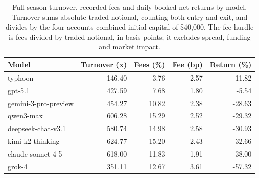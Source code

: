 \begin{table}[htbp]
\centering\small
\caption{Full-season turnover, recorded fees and daily-booked net returns by model. Turnover sums absolute traded notional, counting both entry and exit, and divides by the four accounts\textquotesingle{} combined initial capital of \$40,000. The fee hurdle is fees divided by traded notional, in basis points; it excludes spread, funding and market impact.}
\label{tab:feedbackcosts}
\begin{tabular}{lrrrr}
\toprule
Model & Turnover (x) & Fees (\%) & Fee (bp) & Return (\%) \\
\midrule
typhoon & 146.40 & 3.76 & 2.57 & 11.82 \\
gpt-5.1 & 427.59 & 7.68 & 1.80 & -5.54 \\
gemini-3-pro-preview & 454.27 & 10.82 & 2.38 & -28.63 \\
qwen3-max & 606.28 & 15.29 & 2.52 & -29.32 \\
deepseek-chat-v3.1 & 580.74 & 14.98 & 2.58 & -30.93 \\
kimi-k2-thinking & 624.77 & 15.20 & 2.43 & -32.66 \\
claude-sonnet-4-5 & 618.00 & 11.83 & 1.91 & -38.00 \\
grok-4 & 351.11 & 12.67 & 3.61 & -57.32 \\
\bottomrule
\end{tabular}
\end{table}
